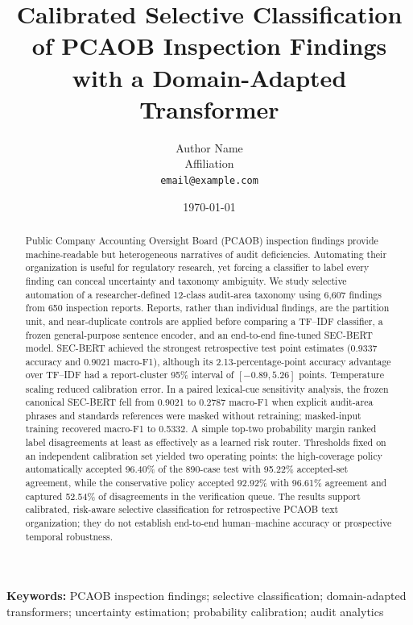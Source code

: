\documentclass[11pt]{article}
\title{Calibrated Selective Classification of PCAOB Inspection Findings\\
with a Domain-Adapted Transformer}
\author{
  Author Name\\
  \small Affiliation\\
  \small \texttt{email@example.com}
}
\date{\today}
\begin{document}
\maketitle

\begin{abstract}
Public Company Accounting Oversight Board (PCAOB) inspection findings provide
machine-readable but heterogeneous narratives of audit deficiencies. Automating
their organization is useful for regulatory research, yet forcing a classifier
to label every finding can conceal uncertainty and taxonomy ambiguity. We study
selective automation of a researcher-defined 12-class audit-area taxonomy using
6,607 findings from 650 inspection reports. Reports, rather than individual
findings, are the partition unit, and near-duplicate controls are applied before
comparing a TF--IDF classifier, a frozen general-purpose sentence encoder, and an
end-to-end fine-tuned SEC-BERT model. SEC-BERT achieved the strongest
retrospective test point estimates (0.9337 accuracy and 0.9021 macro-F1), although
its 2.13-percentage-point accuracy advantage over TF--IDF had a report-cluster
95\% interval of $[-0.89,5.26]$ points. Temperature scaling reduced calibration
error. In a paired lexical-cue sensitivity analysis, the frozen canonical
SEC-BERT fell from 0.9021 to 0.2787 macro-F1 when explicit audit-area phrases
and standards references were masked without retraining; masked-input training
recovered macro-F1 to 0.5332. A simple top-two probability margin ranked label disagreements at
least as effectively as a learned risk router. Thresholds fixed on an independent
calibration set yielded two operating points: the high-coverage policy
automatically accepted 96.40\% of the 890-case test with 95.22\% accepted-set
agreement, while the conservative policy accepted 92.92\% with 96.61\%
agreement and captured 52.54\% of disagreements in the verification queue. The
results support calibrated,
risk-aware selective classification for retrospective PCAOB text organization;
they do not establish end-to-end human--machine accuracy or prospective temporal
robustness.
\end{abstract}

\noindent\textbf{Keywords:}
PCAOB inspection findings; selective classification; domain-adapted transformers;
uncertainty estimation; probability calibration; audit analytics
\end{document}
